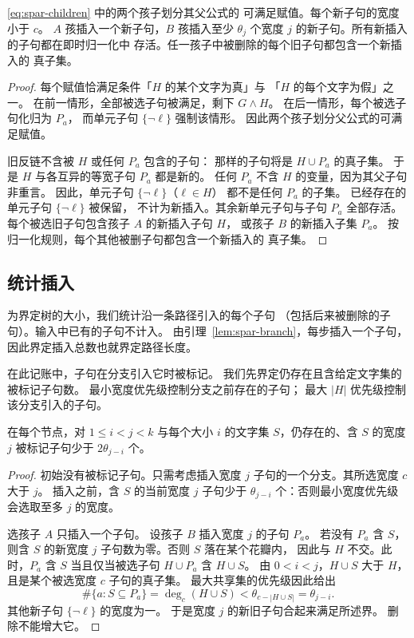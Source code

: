 \begin{lemma}\label{lem:spar-branch}
\eqref{eq:spar-children} 中的两个孩子划分其父公式的
可满足赋值。每个新子句的宽度小于 $c$。
$A$ 孩插入一个新子句，$B$ 孩插入至少 $\theta_j$
个宽度 $j$ 的新子句。所有新插入的子句都在即时归一化中
存活。任一孩子中被删除的每个旧子句都包含一个新插入的
真子集。
\end{lemma}
\begin{proof}
每个赋值恰满足条件「$H$ 的某个文字为真」与
「$H$ 的每个文字为假」之一。
在前一情形，全部被选子句被满足，剩下 $G\wedge H$。
在后一情形，每个被选子句化归为 $P_a$，
而单元子句 $\{\neg\ell\}$ 强制该情形。
因此两个孩子划分父公式的可满足赋值。

旧反链不含被 $H$ 或任何 $P_a$ 包含的子句：
那样的子句将是 $H\cup P_a$ 的真子集。
于是 $H$ 与各互异的等宽子句 $P_a$ 都是新的。
任何 $P_a$ 不含 $H$ 的变量，因为其父子句非重言。
因此，单元子句 $\{\neg\ell\}$（$\ell\in H$）
都不是任何 $P_a$ 的子集。
已经存在的单元子句 $\{\neg\ell\}$ 被保留，
不计为新插入。其余新单元子句与子句 $P_a$ 全部存活。
每个被选旧子句包含孩子 $A$ 的新插入子句 $H$，
或孩子 $B$ 的新插入子集 $P_a$。
按归一化规则，每个其他被删子句都包含一个新插入的
真子集。
\end{proof}

\subsection{统计插入}
为界定树的大小，我们统计沿一条路径引入的每个子句
（包括后来被删除的子句）。输入中已有的子句不计入。
由引理~\ref{lem:spar-branch}，每步插入一个子句，
因此界定插入总数也就界定路径长度。

在此记账中，子句在分支引入它时被标记。
我们先界定仍存在且含给定文字集的被标记子句数。
最小宽度优先级控制分支之前存在的子句；
最大 $|H|$ 优先级控制该分支引入的子句。

\begin{lemma}\label{lem:spar-marked-degree}
在每个节点，对 $1\le i<j<k$ 与每个大小 $i$
的文字集 $S$，仍存在的、含 $S$ 的宽度 $j$
被标记子句少于 $2\theta_{j-i}$ 个。
\end{lemma}
\begin{proof}
初始没有被标记子句。只需考虑插入宽度 $j$
子句的一个分支。其所选宽度 $c$ 大于 $j$。
插入之前，含 $S$ 的当前宽度 $j$ 子句少于
$\theta_{j-i}$ 个：否则最小宽度优先级会选取至多 $j$
的宽度。

选孩子 $A$ 只插入一个子句。
设孩子 $B$ 插入宽度 $j$ 的子句 $P_a$。
若没有 $P_a$ 含 $S$，则含 $S$ 的新宽度 $j$
子句数为零。否则 $S$ 落在某个花瓣内，
因此与 $H$ 不交。此时，$P_a$ 含 $S$
当且仅当被选子句 $H\cup P_a$ 含 $H\cup S$。
由 $0<i<j$，$H\cup S$ 大于 $H$，
且是某个被选宽度 $c$ 子句的真子集。
最大共享集的优先级因此给出
\[
 \#\{a:S\subseteq P_a\}
 =\deg_c(H\cup S)<\theta_{c-|H\cup S|}
 =\theta_{j-i}.
\]
其他新子句 $\{\neg\ell\}$ 的宽度为一。
于是宽度 $j$ 的新旧子句合起来满足所述界。
删除不能增大它。
\end{proof}

